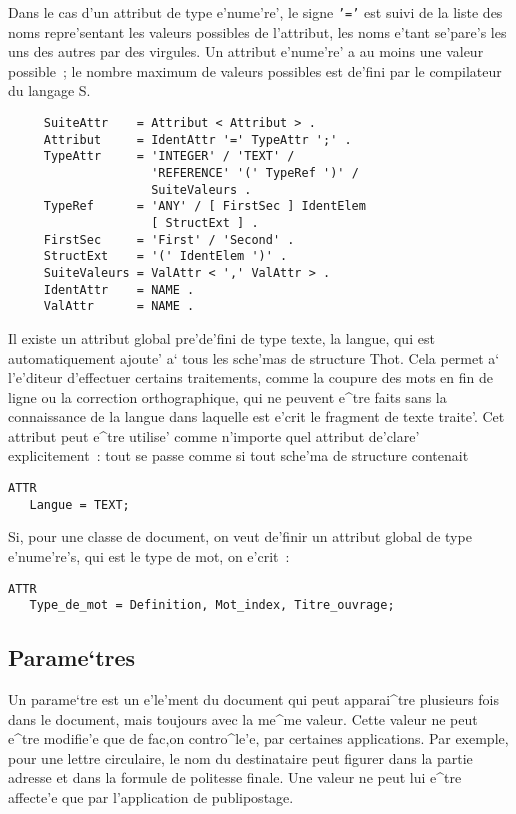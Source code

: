 Dans le cas d'un attribut de type e'nume're', le signe {\tt '='} est suivi
de la liste des noms repre'sentant les valeurs possibles de l'attribut, les
noms e'tant se'pare's les uns des autres par des virgules. Un attribut
e'nume're' a au moins une valeur possible~; le nombre maximum de valeurs
possibles est de'fini par le compilateur du langage S.

\begin{verbatim}
     SuiteAttr    = Attribut < Attribut > .
     Attribut     = IdentAttr '=' TypeAttr ';' .
     TypeAttr     = 'INTEGER' / 'TEXT' /
                    'REFERENCE' '(' TypeRef ')' /
                    SuiteValeurs .
     TypeRef      = 'ANY' / [ FirstSec ] IdentElem
                    [ StructExt ] .
     FirstSec     = 'First' / 'Second' .
     StructExt    = '(' IdentElem ')' .
     SuiteValeurs = ValAttr < ',' ValAttr > .
     IdentAttr    = NAME .
     ValAttr      = NAME .
\end{verbatim}

Il existe un attribut global pre'de'fini de type texte, la langue, qui est
automatiquement ajoute' a` tous les sche'mas de structure Thot. Cela permet
a` l'e'diteur d'effectuer certains traitements, comme la coupure des mots
en fin de ligne ou la correction orthographique, qui ne peuvent e^tre faits
sans la connaissance de la langue dans laquelle est e'crit le fragment de
texte traite'. Cet attribut peut e^tre utilise' comme n'importe quel
attribut de'clare' explicitement~: tout se passe comme si tout sche'ma de
structure contenait
\begin{verbatim}
ATTR
   Langue = TEXT;
\end{verbatim}

\begin{example}
Si, pour une classe de document, on veut de'finir un attribut global de
type e'nume're's, qui est le type de mot, on e'crit~:

\begin{verbatim}
ATTR
   Type_de_mot = Definition, Mot_index, Titre_ouvrage;
\end{verbatim}
\end{example}

\subsection{Parame`tres}
\label{param}

Un parame`tre est un e'le'ment du document qui peut apparai^tre plusieurs fois
dans le document, mais toujours avec la me^me valeur. Cette valeur ne peut
e^tre modifie'e que de fac,on contro^le'e, par certaines applications.
Par exemple, pour une lettre circulaire, le nom du destinataire peut figurer
dans la partie adresse et dans la formule de politesse finale. Une valeur
ne peut lui e^tre affecte'e que par l'application de publipostage.


